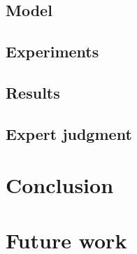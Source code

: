 \documentclass{article}
\begin{document}
\subsection{Model}

\subsection{Experiments}

\subsection{Results}

\subsection{Expert judgment}


\newpage
\section{Conclusion}


\newpage
\section{Future work}

\newpage
{}

\end{document}
